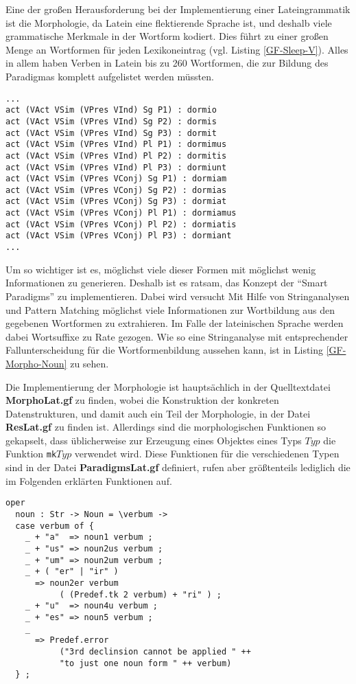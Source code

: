 Eine der großen Herausforderung bei der Implementierung einer Lateingrammatik ist die Morphologie, da Latein eine flektierende Sprache ist, und deshalb viele grammatische Merkmale in der Wortform kodiert. Dies führt zu einer großen Menge an Wortformen für jeden Lexikoneintrag (vgl. Listing \ref{GF-Sleep-V}). Alles in allem haben Verben in Latein bis zu 260 Wortformen, die zur Bildung des Paradigmas komplett aufgelistet werden müssten. \par
\begin{lstlisting}[float=h!tp,caption={Auszug aus dem Paradigma des Verbs \texttt{sleep\_V}},label={GF-Sleep-V},basicstyle=\small]
...
act (VAct VSim (VPres VInd) Sg P1) : dormio
act (VAct VSim (VPres VInd) Sg P2) : dormis
act (VAct VSim (VPres VInd) Sg P3) : dormit
act (VAct VSim (VPres VInd) Pl P1) : dormimus
act (VAct VSim (VPres VInd) Pl P2) : dormitis
act (VAct VSim (VPres VInd) Pl P3) : dormiunt
act (VAct VSim (VPres VConj) Sg P1) : dormiam
act (VAct VSim (VPres VConj) Sg P2) : dormias
act (VAct VSim (VPres VConj) Sg P3) : dormiat
act (VAct VSim (VPres VConj) Pl P1) : dormiamus
act (VAct VSim (VPres VConj) Pl P2) : dormiatis
act (VAct VSim (VPres VConj) Pl P3) : dormiant
...
\end{lstlisting}
Um so wichtiger ist es, möglichst viele dieser Formen mit möglichst wenig Informationen zu generieren. Deshalb ist es ratsam, das Konzept der "`Smart Paradigms"' zu implementieren. Dabei wird versucht Mit Hilfe von Stringanalysen und Pattern Matching möglichst viele Informationen zur Wortbildung aus den gegebenen Wortformen zu extrahieren. Im Falle der lateinischen Sprache werden dabei Wortsuffixe zu Rate gezogen. Wie so eine Stringanalyse mit entsprechender Fallunterscheidung für die Wortformenbildung aussehen kann, ist in Listing \ref{GF-Morpho-Noun} zu sehen.\par
Die Implementierung der Morphologie ist hauptsächlich in der Quelltextdatei \textbf{MorphoLat.gf} zu finden, wobei die Konstruktion der konkreten Datenstrukturen, und damit auch ein Teil der Morphologie, in der Datei \textbf{ResLat.gf} zu finden ist. Allerdings sind die morphologischen Funktionen so gekapselt, dass üblicherweise zur Erzeugung eines Objektes eines Typs $Typ$ die Funktion \texttt{mk$Typ$} verwendet wird. Diese Funktionen für die verschiedenen Typen sind in der Datei \textbf{ParadigmsLat.gf} definiert, rufen aber größtenteils lediglich die im Folgenden erklärten Funktionen auf.
\begin{lstlisting}[float=h!tp,caption={Beispiel für ein Smart Paradigm mit Hilfe von Pattern Matching und Fallunterscheidung (vgl. \textbf{MorphoLat.gf})},label={GF-Morpho-Noun}]
oper
  noun : Str -> Noun = \verbum -> 
  case verbum of {
    _ + "a"  => noun1 verbum ;
    _ + "us" => noun2us verbum ;
    _ + "um" => noun2um verbum ;
    _ + ( "er" | "ir" ) 
      => noun2er verbum 
           ( (Predef.tk 2 verbum) + "ri" ) ;
    _ + "u"  => noun4u verbum ;
    _ + "es" => noun5 verbum ;
    _  
      => Predef.error 
           ("3rd declinsion cannot be applied " ++ 
           "to just one noun form " ++ verbum)
  } ;
\end{lstlisting}

